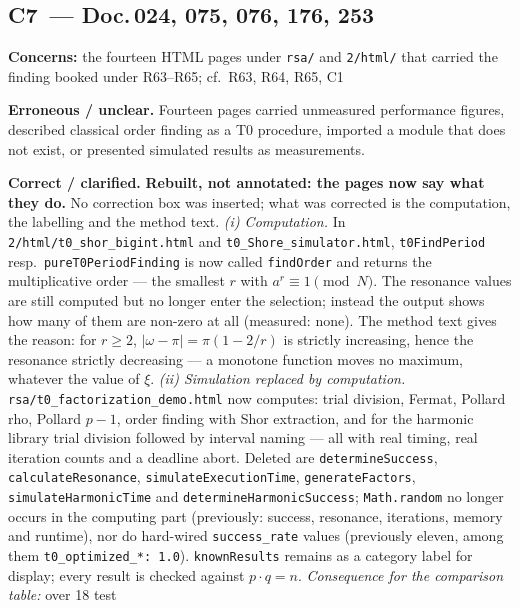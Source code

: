 \medskip

\subsection*{C7~--- Doc.\,024, 075, 076, 176, 253}

\noindent\textbf{Concerns:} the fourteen HTML pages under \texttt{rsa/}
and \texttt{2/html/} that carried the finding booked under R63--R65;
cf.\ R63, R64, R65, C1

\smallskip\noindent\textbf{Erroneous / unclear.}\quad
Fourteen pages carried unmeasured performance figures, described
classical order finding as a T0 procedure, imported a module that does
not exist, or presented simulated results as measurements.

\smallskip\noindent\textbf{Correct / clarified.}\quad
\textbf{Rebuilt, not annotated: the pages now say what they do.} No
correction box was inserted; what was corrected is the computation, the
labelling and the method text.
\emph{(i) Computation.} In \texttt{2/html/t0\_shor\_bigint.html} and
\texttt{t0\_Shore\_simulator.html}, \texttt{t0FindPeriod} resp.\
\texttt{pureT0PeriodFinding} is now called \texttt{findOrder} and returns
the multiplicative order --- the smallest $r$ with
$a^r \equiv 1 \pmod N$. The resonance values are still computed but no
longer enter the selection; instead the output shows how many of them
are non-zero at all (measured: none). The method text gives the reason:
for $r \ge 2$, $|\omega-\pi| = \pi(1-2/r)$ is strictly increasing, hence
the resonance strictly decreasing --- a monotone function moves no
maximum, whatever the value of $\xi$.
\emph{(ii) Simulation replaced by computation.}
\texttt{rsa/t0\_factorization\_demo.html} now computes: trial division,
Fermat, Pollard rho, Pollard $p-1$, order finding with Shor extraction,
and for the harmonic library trial division followed by interval naming
--- all with real timing, real iteration counts and a deadline abort.
Deleted are \texttt{determineSuccess}, \texttt{calculateResonance},
\texttt{simulateExecutionTime}, \texttt{generateFactors},
\texttt{simulateHarmonicTime} and \texttt{determineHarmonicSuccess};
\texttt{Math.random} no longer occurs in the computing part (previously:
success, resonance, iterations, memory and runtime), nor do hard-wired
\texttt{success\_rate} values (previously eleven, among them
\texttt{t0\_optimized\_*: 1.0}). \texttt{knownResults} remains as a
category label for display; every result is checked against
$p\cdot q = n$. \emph{Consequence for the comparison table:} over 18 test
